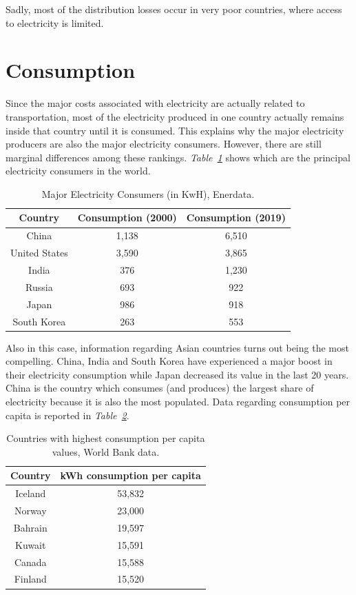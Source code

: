 \documentclass[a4paper,12pt]{book}
\begin{document}
Sadly, most of the distribution losses occur in very poor countries, where access to electricity is limited.

\section{Consumption}

Since the major costs associated with electricity are actually related to transportation, most of the electricity produced in one country actually remains inside that country until it is consumed. This explains why the major electricity producers are also the major electricity consumers. However, there are still marginal differences among these rankings. \textit{Table~\ref{Tab:producers}} shows which are the principal electricity consumers in the world.

\begin{table}[hbt]
\begin{center}
\begin{tabular}{|c|c|c|}
\hline
Country & Consumption (2000) & Consumption (2019)\\
\hline
China & 1,138 & 6,510\\
United States & 3,590 & 3,865\\
India & 376 & 1,230\\
Russia & 693 & 922\\
Japan & 986 & 918\\
South Korea & 263 & 553\\
\hline
\end{tabular}
\caption{Major Electricity Consumers (in KwH), Enerdata.}
\label{Tab:producers}
\end{center}
\end{table}

Also in this case, information regarding Asian countries turns out being the most compelling. China, India and South Korea have experienced a major boost in their electricity consumption while Japan decreased its value in the last 20 years. China is the country which consumes (and produces) the largest share of electricity because it is also the most populated. Data regarding consumption per capita is reported in \textit{Table~\ref{Tab:cons}}.

\begin{table}[hbt]
\begin{center}
\begin{tabular}{|c|c|}
\hline
Country & kWh consumption per capita\\
\hline
Iceland & 53,832\\
Norway & 23,000\\
Bahrain & 19,597\\
Kuwait & 15,591\\
Canada & 15,588\\
Finland & 15,520\\
\hline
\end{tabular}
\caption{Countries with highest consumption per capita values, World Bank data.}
\label{Tab:cons}
\end{center}
\end{table}
\end{document}
